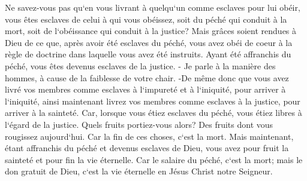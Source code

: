 \verse Ne savez-vous pas qu`en vous livrant à quelqu`un comme esclaves pour lui obéir, vous êtes esclaves de celui à qui vous obéissez, soit du péché qui conduit à la mort, soit de l`obéissance qui conduit à la justice? 
\verse Mais grâces soient rendues à Dieu de ce que, après avoir été esclaves du péché, vous avez obéi de coeur à la règle de doctrine dans laquelle vous avez été instruits. 
\verse Ayant été affranchis du péché, vous êtes devenus esclaves de la justice. - 
\verse Je parle à la manière des hommes, à cause de la faiblesse de votre chair. -De même donc que vous avez livré vos membres comme esclaves à l`impureté et à l`iniquité, pour arriver à l`iniquité, ainsi maintenant livrez vos membres comme esclaves à la justice, pour arriver à la sainteté. 
\verse Car, lorsque vous étiez esclaves du péché, vous étiez libres à l`égard de la justice. 
\verse Quels fruits portiez-vous alors? Des fruits dont vous rougissez aujourd`hui. Car la fin de ces choses, c`est la mort. 
\verse Mais maintenant, étant affranchis du péché et devenus esclaves de Dieu, vous avez pour fruit la sainteté et pour fin la vie éternelle. 
\verse Car le salaire du péché, c`est la mort; mais le don gratuit de Dieu, c`est la vie éternelle en Jésus Christ notre Seigneur. 

